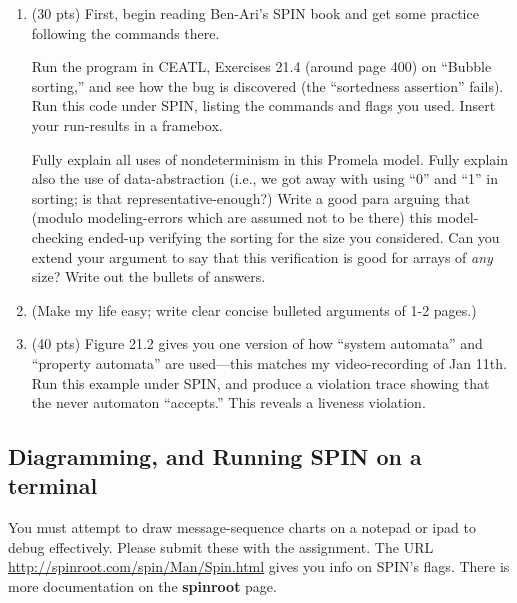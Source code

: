 \documentclass[11pt]{article}
\begin{document}
\begin{enumerate}
\item (30 pts) First, begin reading Ben-Ari's SPIN book and get some practice
  following the commands there.

  Run the program in CEATL, Exercises
  21.4 (around page 400) on ``Bubble sorting,'' and see how the bug is discovered
  (the ``sortedness assertion'' fails).
  Run this code under SPIN, listing the commands and flags you used.
  Insert your run-results in a framebox.
  
  Fully explain all uses of nondeterminism in this Promela model.
  Fully explain also the use of data-abstraction (i.e., we got away with
  using ``0'' and ``1'' in sorting; is that representative-enough?)
  Write a good para arguing that (modulo modeling-errors which are assumed
  not to be there) this model-checking ended-up verifying the sorting for the size
  you considered.
  Can you extend your argument to say that this verification is good for
  arrays of {\em any} size? Write out the bullets of answers.
  
  \item[] (Make my life easy; write clear concise bulleted arguments of 1-2 pages.)

    \clearpage
  
  \item (40 pts) Figure 21.2 gives you one version of how ``system automata''
    and ``property automata'' are used---this matches my video-recording
    of Jan 11th.
    Run this example under SPIN, and produce a violation trace showing that
    the never automaton ``accepts.'' This reveals a liveness violation.
\end{enumerate}

    \clearpage
    
\subsection*{Diagramming, and Running SPIN on a terminal}

You must attempt to draw message-sequence charts on a notepad or ipad to debug effectively.
Please submit these with the assignment.
The URL \url{http://spinroot.com/spin/Man/Spin.html} gives you info on SPIN's flags.
There is more documentation on the {\bf spinroot} page.
\end{document}
